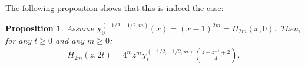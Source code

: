 \documentclass[12pt,reqno]{amsart}
\newtheorem{proposition}{Proposition}
\begin{document}
The following proposition shows that this is indeed the case: 
\begin{proposition} Assume $\chi^{(-1/2,-1/2,m)}_0(x) = (x-1)^{2m} = H_{2m}(x,0)$. Then, for any $t\geq 0$ and any $m\geq 0$:
\label{prop:relationunitaryjacobi}
    \begin{align}
    H_{2m}(z,2t)=4^mz^m\chi^{(-1/2,-1/2,m)}_t\left(\frac{z+z^{-1}+2}{4}\right).
    \end{align}
\end{proposition}
    
\end{document}
